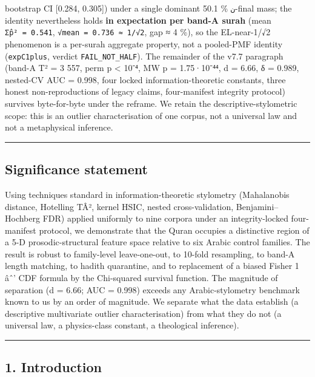 \documentclass[
]{article}
\begin{document}
bootstrap CI {[}0.284, 0.305{]}) under a single dominant 50.1 \%
\texttt{ن}-final mass; the identity nevertheless holds \textbf{in
expectation per band-A surah} (mean \texttt{Σp̂²\ =\ 0.541},
\texttt{√mean\ =\ 0.736\ ≈\ 1/√2}, gap ≈ 4 \%), so the EL-near-1/√2
phenomenon is a per-surah aggregate property, not a pooled-PMF identity
(\texttt{expC1plus}, verdict \texttt{FAIL\_NOT\_HALF}). The remainder of
the v7.7 paragraph (band-A T² = 3 557, perm p \textless{} 10⁻⁴, MW p =
1.75·10⁻⁴⁴, d = 6.66, δ = 0.989, nested-CV AUC = 0.998, four locked
information-theoretic constants, three honest non-reproductions of
legacy claims, four-manifest integrity protocol) survives byte-for-byte
under the reframe. We retain the descriptive-stylometric scope: this is
an outlier characterisation of one corpus, not a universal law and not a
metaphysical inference.

\begin{center}\rule{0.5\linewidth}{0.5pt}\end{center}

\subsection{Significance statement}\label{significance-statement}

Using techniques standard in information-theoretic stylometry
(Mahalanobis distance, Hotelling TÂ², kernel HSIC, nested
cross-validation, Benjamini--Hochberg FDR) applied uniformly to nine
corpora under an integrity-locked four-manifest protocol, we demonstrate
that the Quran occupies a distinctive region of a 5-D
prosodic-structural feature space relative to six Arabic control
families. The result is robust to family-level leave-one-out, to 10-fold
resampling, to band-A length matching, to hadith quarantine, and to
replacement of a biased Fisher 1 âˆ' CDF formula by the Chi-squared
survival function. The magnitude of separation (d = 6.66; AUC = 0.998)
exceeds any Arabic-stylometry benchmark known to us by an order of
magnitude. We separate what the data establish (a descriptive
multivariate outlier characterisation) from what they do not (a
universal law, a physics-class constant, a theological inference).

\begin{center}\rule{0.5\linewidth}{0.5pt}\end{center}

\subsection{1. Introduction}\label{introduction}
\end{document}

